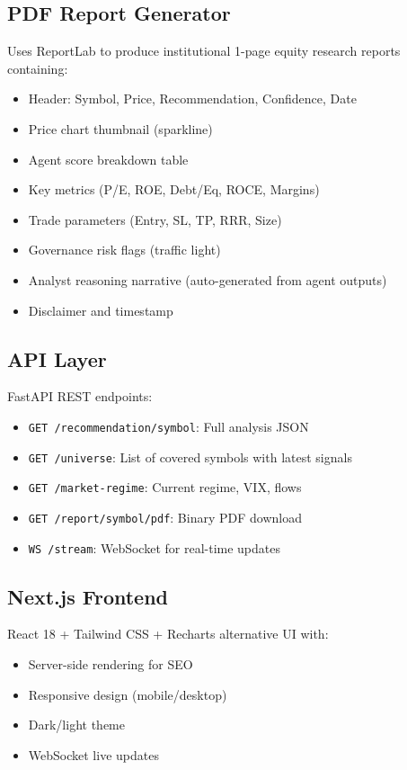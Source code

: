 \documentclass[12pt,a4paper]{report}
\begin{document}
\subsection{PDF Report Generator}
Uses ReportLab to produce institutional 1-page equity research reports containing:
\begin{itemize}
\item Header: Symbol, Price, Recommendation, Confidence, Date
\item Price chart thumbnail (sparkline)
\item Agent score breakdown table
\item Key metrics (P/E, ROE, Debt/Eq, ROCE, Margins)
\item Trade parameters (Entry, SL, TP, RRR, Size)
\item Governance risk flags (traffic light)
\item Analyst reasoning narrative (auto-generated from agent outputs)
\item Disclaimer and timestamp
\end{itemize}

\subsection{API Layer}
FastAPI REST endpoints:
\begin{itemize}
\item \texttt{GET /recommendation/{symbol}}: Full analysis JSON
\item \texttt{GET /universe}: List of covered symbols with latest signals
\item \texttt{GET /market-regime}: Current regime, VIX, flows
\item \texttt{GET /report/{symbol}/pdf}: Binary PDF download
\item \texttt{WS /stream}: WebSocket for real-time updates
\end{itemize}

\subsection{Next.js Frontend}
React 18 + Tailwind CSS + Recharts alternative UI with:
\begin{itemize}
\item Server-side rendering for SEO
\item Responsive design (mobile/desktop)
\item Dark/light theme
\item WebSocket live updates
\end{itemize}
\end{document}
